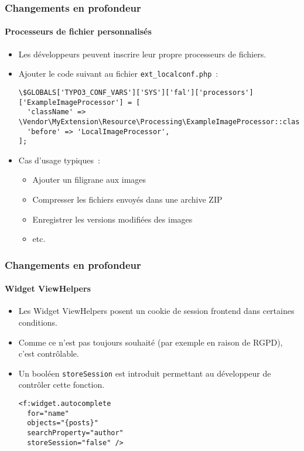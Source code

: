 
\begin{frame}[fragile]
	\frametitle{Changements en profondeur}
	\framesubtitle{Processeurs de fichier personnalisés}

	\lstset{basicstyle=\tiny\ttfamily}

	\begin{itemize}
		\item Les développeurs peuvent inscrire leur propre processeurs de fichiers.
		\item Ajouter le code suivant au fichier \texttt{ext\_localconf.php}~:
\begin{lstlisting}
\$GLOBALS['TYPO3_CONF_VARS']['SYS']['fal']['processors']['ExampleImageProcessor'] = [
  'className' => \Vendor\MyExtension\Resource\Processing\ExampleImageProcessor::class,
  'before' => 'LocalImageProcessor',
];
\end{lstlisting}

		\item Cas d'usage typiques~:

			\begin{itemize}
				\item Ajouter un filigrane aux images
				\item Compresser les fichiers envoyés dans une archive ZIP
				\item Enregistrer les versions modifiées des images
				\item etc.
			\end{itemize}

	\end{itemize}

\end{frame}


\begin{frame}[fragile]
	\frametitle{Changements en profondeur}
	\framesubtitle{Widget ViewHelpers}

	\lstset{basicstyle=\smaller\ttfamily}

	\begin{itemize}
		\item Les Widget ViewHelpers posent un cookie de session frontend dans certaines conditions.
		\item Comme ce n'est pas toujours souhaité (par exemple en raison de RGPD), c'est contrôlable.
		\item Un booléen \texttt{storeSession} est introduit permettant au développeur de contrôler cette fonction.
\begin{lstlisting}
<f:widget.autocomplete
  for="name"
  objects="{posts}"
  searchProperty="author"
  storeSession="false" />
\end{lstlisting}

	\end{itemize}

\end{frame}

